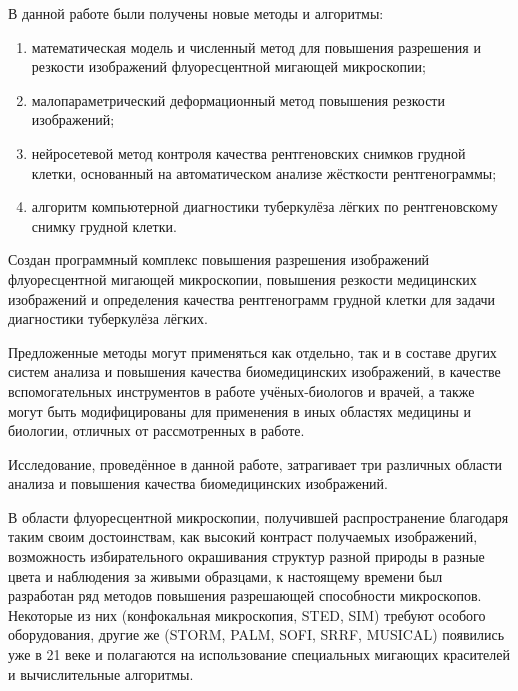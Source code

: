 {\novelty}

В данной работе были получены новые методы и алгоритмы:
\begin{enumerate}[beginpenalty=10000]
	\item математическая модель и численный метод для повышения разрешения и резкости изображений флуоресцентной мигающей микроскопии;
	
	\item малопараметрический деформационный метод повышения резкости изображений;
	
	\item нейросетевой метод контроля качества рентгеновских снимков грудной клетки, основанный на автоматическом анализе жёсткости рентгенограммы;
	
	\item алгоритм компьютерной диагностики туберкулёза лёгких по рентгеновскому снимку грудной клетки.
\end{enumerate}


{\influence}

Создан программный комплекс повышения разрешения изображений флуоресцентной мигающей микроскопии, повышения резкости медицинских изображений и определения качества рентгенограмм грудной клетки для задачи диагностики туберкулёза лёгких.

Предложенные методы могут применяться как отдельно, так и в составе других систем анализа и повышения качества биомедицинских изображений, в качестве вспомогательных инструментов в работе учёных-биологов и врачей, а также могут быть модифицированы для применения в иных областях медицины и биологии, отличных от рассмотренных в работе.


{\progress}

Исследование, проведённое в данной работе, затрагивает три различных области анализа и повышения качества биомедицинских изображений.

В области флуоресцентной микроскопии, получившей распространение благодаря таким своим достоинствам, как высокий контраст получаемых изображений, возможность избирательного окрашивания структур разной природы в разные цвета и наблюдения за живыми образцами, к настоящему времени был разработан ряд методов повышения разрешающей способности микроскопов. Некоторые из них (конфокальная микроскопия, STED, SIM) требуют особого оборудования, другие же (STORM, PALM, SOFI, SRRF, MUSICAL) появились уже в 21 веке и полагаются на использование специальных мигающих красителей и вычислительные алгоритмы.

